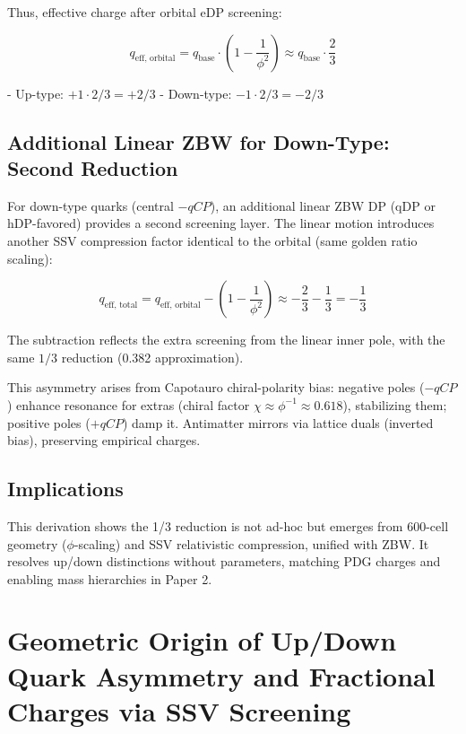 \documentclass{article}
\begin{document}
Thus, effective charge after orbital eDP screening:

\begin{equation}
q_{\text{eff, orbital}} = q_{\text{base}} \cdot \left(1 - \frac{1}{\phi^2}\right) \approx q_{\text{base}} \cdot \frac{2}{3}
\end{equation}

- Up-type: $+1 \cdot 2/3 = +2/3$
- Down-type: $-1 \cdot 2/3 = -2/3$

\subsection{Additional Linear ZBW for Down-Type: Second Reduction}

For down-type quarks (central $-qCP$), an additional linear ZBW DP (qDP or hDP-favored) provides a second screening layer. The linear motion introduces another SSV compression factor identical to the orbital (same golden ratio scaling):

\begin{equation}
q_{\text{eff, total}} = q_{\text{eff, orbital}} - \left(1 - \frac{1}{\phi^2}\right) \approx - \frac{2}{3} - \frac{1}{3} = - \frac{1}{3}
\end{equation}

The subtraction reflects the extra screening from the linear inner pole, with the same $1/3$ reduction (0.382 approximation).

This asymmetry arises from Capotauro chiral-polarity bias: negative poles ($-qCP$) enhance resonance for extras (chiral factor $\chi \approx \phi^{-1} \approx 0.618$), stabilizing them; positive poles ($+qCP$) damp it. Antimatter mirrors via lattice duals (inverted bias), preserving empirical charges.

\subsection{Implications}

This derivation shows the 1/3 reduction is not ad-hoc but emerges from 600-cell geometry ($\phi$-scaling) and SSV relativistic compression, unified with ZBW. It resolves up/down distinctions without parameters, matching PDG charges \cite{pdg2024} and enabling mass hierarchies in Paper 2.

\section{Geometric Origin of Up/Down Quark Asymmetry and Fractional Charges via SSV Screening}
\end{document}
